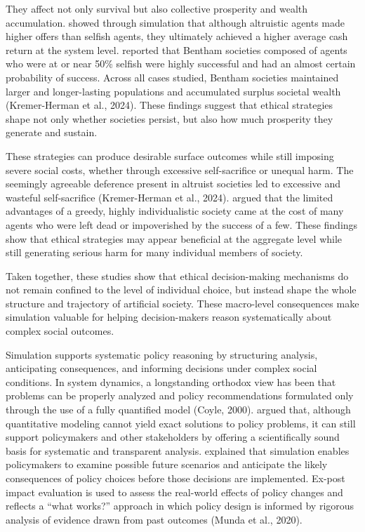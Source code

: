 \documentclass{icsthesis}
\begin{document}
\begin{mainmatter}
They affect not only survival but also collective prosperity and wealth accumulation. \citet{Scalco2015} showed through simulation that although altruistic agents made higher offers than selfish agents, they ultimately achieved a higher average cash return at the system level. \citet{KremerHerman2024b} reported that Bentham societies composed of agents who were at or near 50\% selfish were highly successful and had an almost certain probability of success. Across all cases studied, Bentham societies maintained larger and longer-lasting populations and accumulated surplus societal wealth (Kremer-Herman et al., 2024). These findings suggest that ethical strategies shape not only whether societies persist, but also how much prosperity they generate and sustain.

These strategies can produce desirable surface outcomes while still imposing severe social costs, whether through excessive self-sacrifice or unequal harm. The seemingly agreeable deference present in altruist societies led to excessive and wasteful self-sacrifice (Kremer-Herman et al., 2024). \citet{KremerHerman2024b} argued that the limited advantages of a greedy, highly individualistic society came at the cost of many agents who were left dead or impoverished by the success of a few. These findings show that ethical strategies may appear beneficial at the aggregate level while still generating serious harm for many individual members of society.

Taken together, these studies show that ethical decision-making mechanisms do not remain confined to the level of individual choice, but instead shape the whole structure and trajectory of artificial society. These macro-level consequences make simulation valuable for helping decision-makers reason systematically about complex social outcomes.

Simulation supports systematic policy reasoning by structuring analysis, anticipating consequences, and informing decisions under complex social conditions. In system dynamics, a longstanding orthodox view has been that problems can be properly analyzed and policy recommendations formulated only through the use of a fully quantified model (Coyle, 2000). \citet{Munda2020} argued that, although quantitative modeling cannot yield exact solutions to policy problems, it can still support policymakers and other stakeholders by offering a scientifically sound basis for systematic and transparent analysis. \citet{Tolk2022} explained that simulation enables policymakers to examine possible future scenarios and anticipate the likely consequences of policy choices before those decisions are implemented. Ex-post impact evaluation is used to assess the real-world effects of policy changes and reflects a “what works?” approach in which policy design is informed by rigorous analysis of evidence drawn from past outcomes (Munda et al., 2020).


\end{mainmatter}
\end{document}
